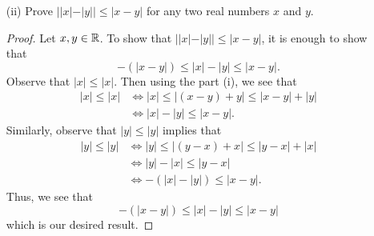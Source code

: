 \documentclass{article}
\begin{document}
\begin{enumerate}
\begin{enumerate}
\begin{proof}
                Now, suppose the result holds for the \( n  \)th case. We will show that the \( n + 1  \) case holds.  Note that \(  p = ({x}_{1} + {x}_{2} + \cdots + {x}_{n}) \). So, applying the result for \( n = 2  \) yields the following result:
                \begin{align*}
                    | {x}_{1} + {x}_{2} + \cdots + {x}_{n} + {x}_{n+1} | &= | ({x}_{1} + {x}_{2} + \cdots + {x}_{n}) + {x}_{n+1}  |  \\
                                                                         &= | p + {x}_{n+1} | \\
                                                                         &\leq | p  |  + | {x}_{n+1} |.
                \end{align*}
                By our induction hypothesis, we see that 
                \[  | {x}_{1} + {x}_{2} + \cdots + {x}_{n} |  \leq | {x}_{1} |  + | {x}_{2} |  + \cdots + | {x}_{n} |. \]
                Thus, we have
                \[  | {x}_{1} + {x}_{2} + \cdots + {x}_{n} +  {x}_{n+1} | \leq | {z}_{1}  |  + | {x}_{2}  |  + \cdots + | {x}_{n} |  + | {x}_{n+1} |  \]
                and we are done.
                \end{proof}
            \item[(ii)] Prove \( | | x  |  - | y  |  | \leq | x - y  |  \) for any two real numbers \( x  \) and \( y  \). 
                \begin{proof}
                Let \( x,y \in \mathbb{R}  \). To show that \( | | x |  - | y |  | \leq | x - y  |  \), it is enough to show that 
                \[  -(| x  -  y |) \leq |x  | - | y | \leq | x - y |.   \]
                Observe that \( | x  |  \leq | x  |  \). Then using the part (i), we see that 
                \begin{align*}
                    | x  |  \leq | x  | &\Longleftrightarrow | x |  \leq | (x-y) + y |  \leq | x - y  |  + | y |  \\
                                        &\Longleftrightarrow | x  |  - | y  | \leq |  x - y  |.
                \end{align*}
                Similarly, observe that \( | y |  \leq | y  |  \) implies that 
                \begin{align*}
                    | y | \leq | y  | &\Longleftrightarrow | y  |  \leq | (y-x) + x  | \leq | y - x  | + | x  |   \\
                          &\Longleftrightarrow | y  | - | x |  \leq | y - x  | \\
                          &\Longleftrightarrow -(| x |  - | y |) \leq |  x-  y  |.   
                \end{align*}
                Thus, we see that 
                \[  -(| x  -  y |) \leq |x  | - | y | \leq | x - y |   \]
                which is our desired result.
                \end{proof}
        \end{enumerate}


\end{enumerate}
\end{document}
